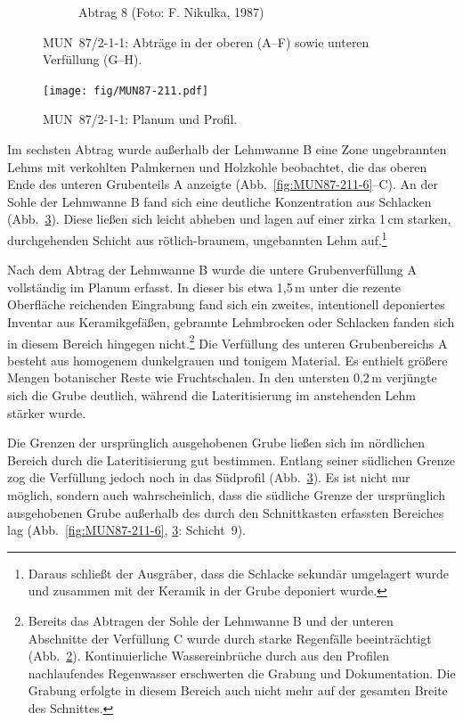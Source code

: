 \begin{figure}[p]
\begin{subfigure}{\columnwidth}
		\caption{Abtrag 8 (Foto: F. Nikulka, 1987)}
		\label{fig:MUN87-211-8}
	\end{subfigure}
	\caption{MUN~87/2-1-1: Abträge in der oberen (A--F) sowie unteren Verfüllung (G--H).}
	\label{fig:MUN87.2-1-1-5_Foto}\label{fig:MUN87-211_Oben}\label{fig:MUN87.2-1-1-7+8_Foto}
\end{figure}

\begin{figure}[p]
	\centering
	\texttt{[image: fig/MUN87-211.pdf]}
	\caption{MUN~87/2-1-1: Planum und Profil.}
	\label{fig:MUN87.2-1-1_Planum+Profil_Zeichnung}
\end{figure}

Im sechsten Abtrag wurde außerhalb der Lehmwanne B eine Zone ungebrannten Lehms mit verkohlten Palmkernen und Holzkohle beobachtet, die das oberen Ende des unteren Grubenteils A anzeigte (Abb.~\ref{fig:MUN87-211-6}--C). An der Sohle der Lehmwanne B fand sich eine deutliche Konzentration aus Schlacken (Abb.~\ref{fig:MUN87.2-1-1_Planum+Profil_Zeichnung}). Diese ließen sich leicht abheben und lagen auf einer zirka 1\,cm starken, durchgehenden Schicht aus rötlich-braunem, ungebannten Lehm auf.\footnote{Daraus schließt der Ausgräber, dass die Schlacke sekundär umgelagert wurde und zusammen mit der Keramik in der Grube deponiert wurde.}

Nach dem Abtrag der Lehmwanne B wurde die untere Grubenverfüllung A vollständig im Planum erfasst. In dieser bis etwa 1,5\,m unter die rezente Oberfläche reichenden Eingrabung fand sich ein zweites, intentionell deponiertes Inventar aus Keramikgefäßen, gebrannte Lehmbrocken oder Schlacken fanden sich in diesem Bereich hingegen nicht.\footnote{Bereits das Abtragen der Sohle der Lehmwanne B und der unteren Abschnitte der Verfüllung C wurde durch starke Regenfälle beeinträchtigt (Abb.~\ref{fig:MUN87.2-1-1-7+8_Foto}). Kontinuierliche Wassereinbrüche durch aus den Profilen nachlaufendes Regenwasser erschwerten die Grabung und Dokumentation. Die Grabung erfolgte in diesem Bereich auch nicht mehr auf der gesamten Breite des Schnittes.} Die Verfüllung des unteren Grubenbereichs A besteht aus homogenem dunkelgrauen und tonigem Material. Es enthielt größere Mengen botanischer Reste wie Fruchtschalen. In den untersten 0,2\,m verjüngte sich die Grube deutlich, während die Lateritisierung im anstehenden Lehm stärker wurde.

Die Grenzen der ursprünglich ausgehobenen Grube ließen sich im nördlichen Bereich durch die Lateritisierung gut bestimmen. Entlang seiner südlichen Grenze zog die Verfüllung jedoch noch in das Südprofil (Abb.~\ref{fig:MUN87.2-1-1_Planum+Profil_Zeichnung}). Es ist nicht nur möglich, sondern auch wahrscheinlich, dass die südliche Grenze der ursprünglich ausgehobenen Grube außerhalb des durch den Schnittkasten erfassten Bereiches lag (Abb.~\ref{fig:MUN87-211-6}, \ref{fig:MUN87.2-1-1_Planum+Profil_Zeichnung}: Schicht~9).

